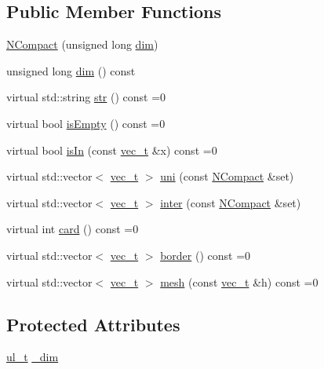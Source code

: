 \subsection*{Public Member Functions}
\begin{DoxyCompactItemize}
\item 
\mbox{\hyperlink{class_n_compact_adca59e9cffb585724a81bb3fa6cc735f}{N\+Compact}} (unsigned long \mbox{\hyperlink{class_n_compact_a795625c0eda03eb2e113b125948224b0}{dim}})
\item 
unsigned long \mbox{\hyperlink{class_n_compact_a795625c0eda03eb2e113b125948224b0}{dim}} () const
\item 
virtual std\+::string \mbox{\hyperlink{class_n_compact_af1879d7342bf6d9902ed5473f6e89038}{str}} () const =0
\item 
virtual bool \mbox{\hyperlink{class_n_compact_a574764d7ac4fe2393a739b67bf57a7f1}{is\+Empty}} () const =0
\item 
virtual bool \mbox{\hyperlink{class_n_compact_a387e86914973c69b292782f640368680}{is\+In}} (const \mbox{\hyperlink{_n_vector_8h_a0a2cfc67e738a3d73e4f12098c4c07f6}{vec\+\_\+t}} \&x) const =0
\item 
virtual std\+::vector$<$ \mbox{\hyperlink{_n_vector_8h_a0a2cfc67e738a3d73e4f12098c4c07f6}{vec\+\_\+t}} $>$ \mbox{\hyperlink{class_n_compact_a64fb223b2f03a10d80e1290f1947f026}{uni}} (const \mbox{\hyperlink{class_n_compact}{N\+Compact}} \&set)
\item 
virtual std\+::vector$<$ \mbox{\hyperlink{_n_vector_8h_a0a2cfc67e738a3d73e4f12098c4c07f6}{vec\+\_\+t}} $>$ \mbox{\hyperlink{class_n_compact_a5806924822793fdd89f4168e1e8c4d3c}{inter}} (const \mbox{\hyperlink{class_n_compact}{N\+Compact}} \&set)
\item 
virtual int \mbox{\hyperlink{class_n_compact_a816bb4976567a7bfed57763ce717b685}{card}} () const =0
\item 
virtual std\+::vector$<$ \mbox{\hyperlink{_n_vector_8h_a0a2cfc67e738a3d73e4f12098c4c07f6}{vec\+\_\+t}} $>$ \mbox{\hyperlink{class_n_compact_af7acc50099e80fc13ce32c97e6857308}{border}} () const =0
\item 
virtual std\+::vector$<$ \mbox{\hyperlink{_n_vector_8h_a0a2cfc67e738a3d73e4f12098c4c07f6}{vec\+\_\+t}} $>$ \mbox{\hyperlink{class_n_compact_ad4cdc60c75ca433c63f44ec13063e2fe}{mesh}} (const \mbox{\hyperlink{_n_vector_8h_a0a2cfc67e738a3d73e4f12098c4c07f6}{vec\+\_\+t}} \&h) const =0
\end{DoxyCompactItemize}
\subsection*{Protected Attributes}
\begin{DoxyCompactItemize}
\item 
\mbox{\hyperlink{group___n_algebra_ga1b140a2034db3f5dfe18a987745df43a}{ul\+\_\+t}} \mbox{\hyperlink{class_n_compact_a0f13086af28c4e2dbbcaa308f28ed506}{\+\_\+dim}}
\end{DoxyCompactItemize}
